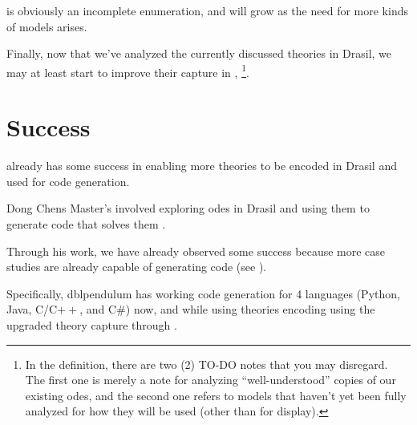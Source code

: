 \ModelKinds{} is obviously an incomplete enumeration, and will grow as the need
for more kinds of models arises.


























Finally, now that we've analyzed the currently discussed theories in Drasil, we
may at least start to improve their capture in \ModelKinds{},
 \footnote{In the 
definition, there are two (2) TO-DO notes that you may disregard. The first one
is merely a note for analyzing ``well-understood'' copies of our existing
\acsp{ode}, and the second one refers to models that haven't yet been fully
analyzed for how they will be used (other than for display).}.

\currentModelKindsHaskell{}




























\section{Success}
\label{chap:more-theory-kinds:sec:success}

\ModelKind{} already has some success in enabling more theories to be encoded in
Drasil and used for code generation.

Dong Chens Master's involved exploring \acsp{ode} in Drasil and using them to
generate code that solves them \cite{Chen2022MEng}.

Through his work, we have already observed some success because more case
studies are already capable of generating code (see
).

Specifically, \acs{dblpendulum} has working code generation for 4 languages
(Python, Java, C/C\(++\), and C\#) now, and while using theories encoding using
the upgraded theory capture through \ModelKinds{}.

\caseStudiesCodeTableAfterDongsWork{}
